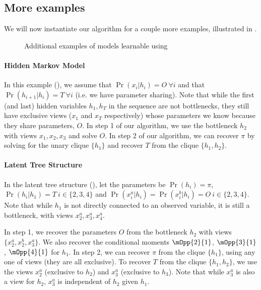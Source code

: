 \subsection{More examples}

We will now instantiate our algorithm for a couple more examples, illustrated in .

\begin{figure}
  \centering
  \caption{Additional examples of models learnable using \LearnMarginals}
  \label{fig:examples}
\end{figure}

\paragraph{Hidden Markov Model}

In this example (), we assume that
  $\Pr(x_i|h_i) = O  ~\forall i$  and that $\Pr(h_{i+1} | h_i)
  = T ~\forall i$ (i.e. we have parameter sharing).
Note that while the first (and last) hidden variables $h_1, h_T$ in the
  sequence are not bottlenecks, they still have exclusive views ($x_1$ and
  $x_T$ respectively) whose parameters we know because they share
  parameters, $O$.
In step 1 of our algorithm, we use the bottleneck $h_2$ with views $x_1,
  x_2, x_3$ and solve $O$.
In step 2 of our algorithm, we can recover $\pi$ by solving for the
  unary clique $\{h_1\}$ and recover $T$ from the clique $\{h_{1},
  h_{2}\}$.

\paragraph{Latent Tree Structure}

In the latent tree structure (), let the
  parameters be $\Pr(h_i) = \pi$, $\Pr(h_i | h_1) = T ~i \in \{2,3,4\}$
  and $\Pr(x^a_i | h_i) = \Pr(x^b_i | h_i) = O ~i \in \{2,3,4\}$.
Note that while $h_1$ is not directly connected to an observed variable,
  it is still a bottleneck, with views $x^a_2, x^a_3, x^a_4$.

In step 1, we recover the parameters $O$ from the bottleneck $h_2$ with
  views $\{x^a_2, x^b_2, x^a_3\}$. We also recover the conditional moments
  $\mOpp{2}{1}$, $\mOpp{3}{1}$, $\mOpp{4}{1}$ for $h_1$. 
In step 2, we can recover $\pi$ from the clique $\{h_1\}$, using any
  one of views (they are all exclusive). 
To recover $T$ from the clique $\{h_1, h_2\}$, we use the views $x^a_2$
  (exclusive to $h_2$) and $x^a_3$ (exclusive to $h_3$). Note that while
  $x^a_3$ is also a view for $h_2$, $x^a_3$ is independent of $h_2$ given
  $h_1$.

